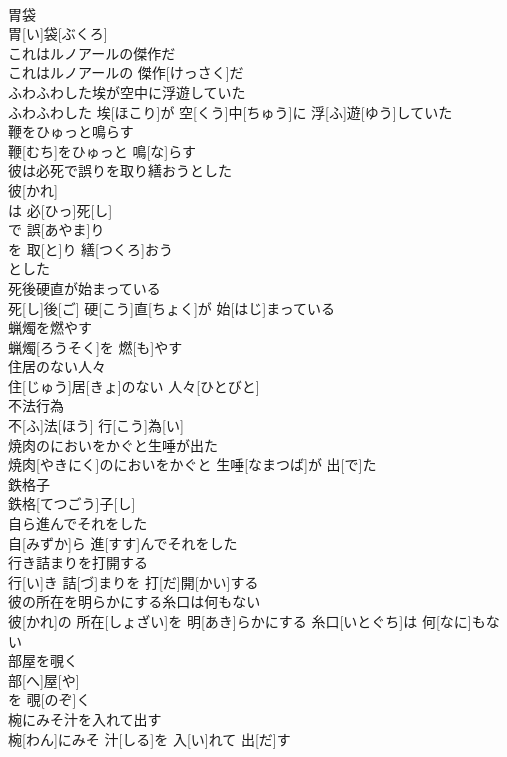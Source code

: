 \documentclass[8pt]{extreport}
\begin{document}
\begin{CJK}{UTF8}{min}
\\	胃袋	
\\	胃[い]袋[ぶくろ]
\\	これはルノアールの傑作だ	
\\	これはルノアールの 傑作[けっさく]だ
\\	ふわふわした埃が空中に浮遊していた	
\\	ふわふわした 埃[ほこり]が 空[くう]中[ちゅう]に 浮[ふ]遊[ゆう]していた
\\	鞭をひゅっと鳴らす	
\\	鞭[むち]をひゅっと 鳴[な]らす
\\	彼は必死で誤りを取り繕おうとした	
\\	彼[かれ]
\\	は 必[ひっ]死[し]
\\	で 誤[あやま]り 
\\	を 取[と]り 繕[つくろ]おう 
\\	とした
\\	死後硬直が始まっている	
\\	死[し]後[ご] 硬[こう]直[ちょく]が 始[はじ]まっている
\\	蝋燭を燃やす	
\\	蝋燭[ろうそく]を 燃[も]やす
\\	住居のない人々	
\\	住[じゅう]居[きょ]のない 人々[ひとびと]
\\	不法行為	
\\	不[ふ]法[ほう] 行[こう]為[い]
\\	焼肉のにおいをかぐと生唾が出た	
\\	焼肉[やきにく]のにおいをかぐと 生唾[なまつば]が 出[で]た
\\	鉄格子	
\\	鉄格[てつごう]子[し]
\\	自ら進んでそれをした	
\\	自[みずか]ら 進[すす]んでそれをした
\\	行き詰まりを打開する	
\\	行[い]き 詰[づ]まりを 打[だ]開[かい]する
\\	彼の所在を明らかにする糸口は何もない	
\\	彼[かれ]の 所在[しょざい]を 明[あき]らかにする 糸口[いとぐち]は 何[なに]もない
\\	部屋を覗く	
\\	部[へ]屋[や]
\\	を 覗[のぞ]く 
\\	椀にみそ汁を入れて出す	
\\	椀[わん]にみそ 汁[しる]を 入[い]れて 出[だ]す

\end{CJK}
\end{document}
